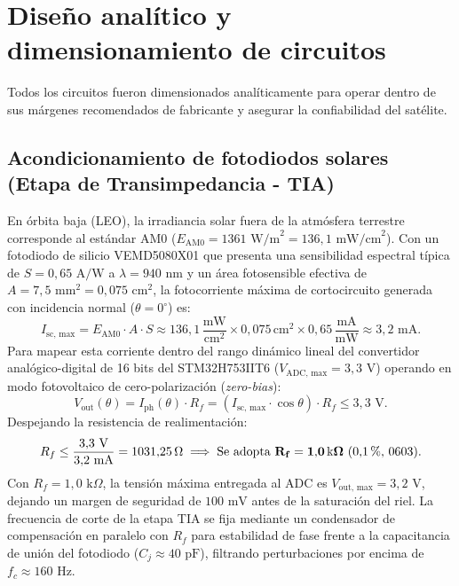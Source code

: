 \documentclass[11pt,a4paper]{article}
\begin{document}
\section{Diseño analítico y dimensionamiento de circuitos}\label{sec:calc}

Todos los circuitos fueron dimensionados analíticamente para operar dentro de sus márgenes recomendados de fabricante y asegurar la confiabilidad del satélite.

\subsection{Acondicionamiento de fotodiodos solares (Etapa de Transimpedancia - TIA)}
En órbita baja (LEO), la irradiancia solar fuera de la atmósfera terrestre corresponde al estándar AM0 ($E_{\text{AM0}} = 1361\text{ W/m}^2 = 136{,}1\text{ mW/cm}^2$). Con un fotodiodo de silicio VEMD5080X01 que presenta una sensibilidad espectral típica de $S = 0{,}65\text{ A/W}$ a $\lambda = 940\text{ nm}$ y un área fotosensible efectiva de $A = 7{,}5\text{ mm}^2 = 0{,}075\text{ cm}^2$, la fotocorriente máxima de cortocircuito generada con incidencia normal ($\theta = 0^\circ$) es:
\begin{equation}
I_{\text{sc, max}} = E_{\text{AM0}} \cdot A \cdot S \approx 136{,}1\,\frac{\text{mW}}{\text{cm}^2} \times 0{,}075\,\text{cm}^2 \times 0{,}65\,\frac{\text{mA}}{\text{mW}} \approx 3{,}2\text{ mA}.
\end{equation}
Para mapear esta corriente dentro del rango dinámico lineal del convertidor analógico-digital de 16 bits del STM32H753IIT6 ($V_{\text{ADC, max}} = 3{,}3\text{ V}$) operando en modo fotovoltaico de cero-polarización (\emph{zero-bias}):
\begin{equation}
V_{\text{out}}(\theta) = I_{\text{ph}}(\theta) \cdot R_f = \left( I_{\text{sc, max}} \cdot \cos\theta \right) \cdot R_f \le 3{,}3\text{ V}.
\end{equation}
Despejando la resistencia de realimentación:
\begin{equation}
R_f \le \frac{3{,}3\text{ V}}{3{,}2\text{ mA}} = 1031{,}25\,\Omega \implies \text{Se adopta } \mathbf{R_f = 1{,}0\,\text{k}\Omega\text{ (0{,}1\,\%, 0603)}}.
\end{equation}
Con $R_f = 1{,}0\text{ k}\Omega$, la tensión máxima entregada al ADC es $V_{\text{out, max}} = 3{,}2\text{ V}$, dejando un margen de seguridad de $100\text{ mV}$ antes de la saturación del riel. La frecuencia de corte de la etapa TIA se fija mediante un condensador de compensación en paralelo con $R_f$ para estabilidad de fase frente a la capacitancia de unión del fotodiodo ($C_j \approx 40\text{ pF}$), filtrando perturbaciones por encima de $f_c \approx 160\text{ Hz}$.
\end{document}

